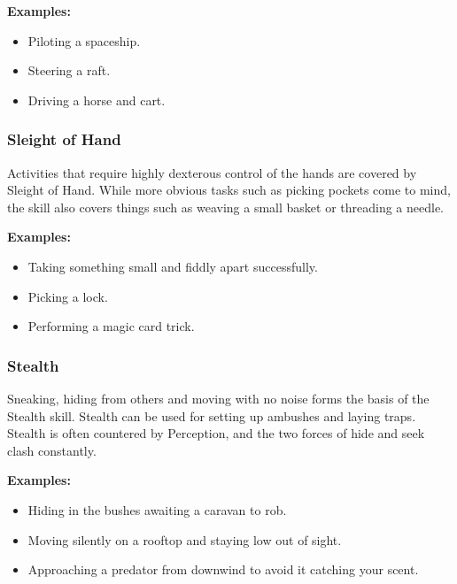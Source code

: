 \begin{displayquote}
    \textbf{Examples:}
    \begin{itemize}
        \item Piloting a spaceship.
        \item Steering a raft.
        \item Driving a horse and cart.
    \end{itemize}
\end{displayquote}

\subsubsection{Sleight of Hand} \label{subsubsec:sleight_of_hand}

Activities that require highly dexterous control of the hands are covered by Sleight of Hand. While more obvious tasks such as picking pockets come to mind, the skill also covers things such as weaving a small basket or threading a needle.

\begin{displayquote}
    \textbf{Examples:}
    \begin{itemize}
        \item Taking something small and fiddly apart successfully.
        \item Picking a lock.
        \item Performing a magic card trick.
    \end{itemize}
\end{displayquote}

\subsubsection{Stealth} \label{subsubsec:stealth}

Sneaking, hiding from others and moving with no noise forms the basis of the Stealth skill. Stealth can be used for setting up ambushes and laying traps. Stealth is often countered by Perception, and the two forces of hide and seek clash constantly.

\begin{displayquote}
    \textbf{Examples:}
    \begin{itemize}
        \item Hiding in the bushes awaiting a caravan to rob.
        \item Moving silently on a rooftop and staying low out of sight.
        \item Approaching a predator from downwind to avoid it catching your scent.
    \end{itemize}
\end{displayquote}

